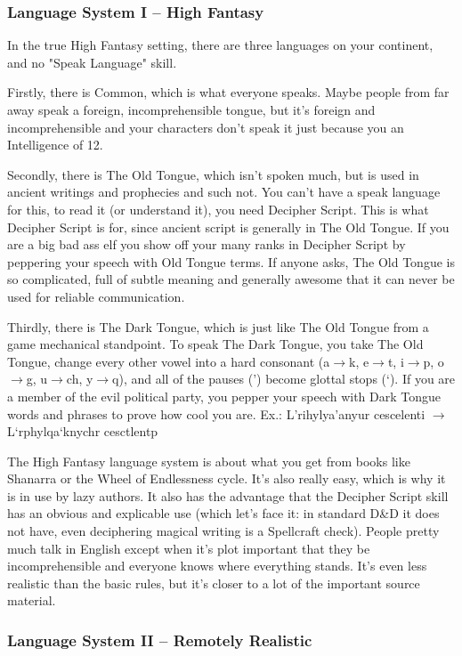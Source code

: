 \subsubsection{Language System I -- High Fantasy}

In the true High Fantasy setting, there are three languages on your continent, and no "Speak Language" skill.

Firstly, there is Common, which is what everyone speaks. Maybe people from far away speak a foreign, incomprehensible tongue, but it's foreign and incomprehensible and your characters don't speak it just because you an Intelligence of 12.

Secondly, there is The Old Tongue, which isn't spoken much, but is used in ancient writings and prophecies and such not. You can't have a speak language for this, to read it (or understand it), you need Decipher Script. This is what Decipher Script is for, since ancient script is generally in The Old Tongue. If you are a big bad ass elf you show off your many ranks in Decipher Script by peppering your speech with Old Tongue terms. If anyone asks, The Old Tongue is so complicated, full of subtle meaning and generally awesome that it can never be used for reliable communication.

Thirdly, there is The Dark Tongue, which is just like The Old Tongue from a game mechanical standpoint. To speak The Dark Tongue, you take The Old Tongue, change every other vowel into a hard consonant (a$\rightarrow$k, e$\rightarrow$t, i$\rightarrow$p, o$\rightarrow$g, u$\rightarrow$ch, y$\rightarrow$q), and all of the pauses (') become glottal stops (`). If you are a member of the evil political party, you pepper your speech with Dark Tongue words and phrases to prove how cool you are.
Ex.: L'rihylya'anyur cescelenti $\rightarrow$ L`rphylqa`knychr cesctlentp

The High Fantasy language system is about what you get from books like Shanarra or the Wheel of Endlessness cycle. It's also really easy, which is why it is in use by lazy authors. It also has the advantage that the Decipher Script skill has an obvious and explicable use (which let's face it: in standard D\&D it does not have, even deciphering magical writing is a Spellcraft check). People pretty much talk in English except when it's plot important that they be incomprehensible and everyone knows where everything stands. It's even less realistic than the basic rules, but it's closer to a lot of the important source material.

\subsubsection{Language System II -- Remotely Realistic}

